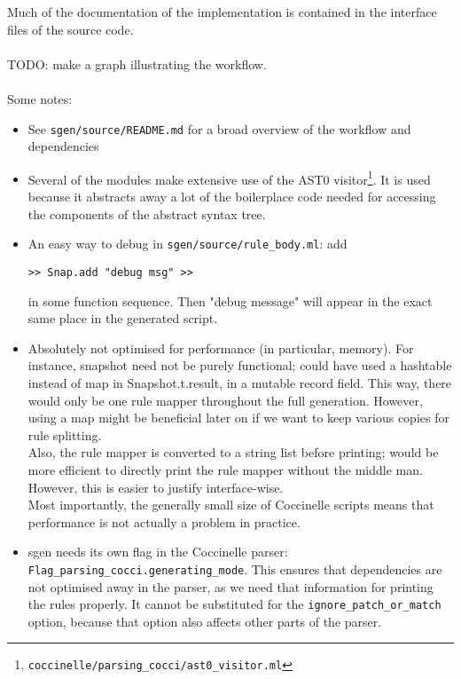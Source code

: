 Much of the documentation of the implementation is contained in the interface files of the source code.\\\\
TODO: make a graph illustrating the workflow.\\\\
Some notes:
\begin{itemize}
\item See \texttt{sgen/source/README.md} for a broad overview of the workflow and dependencies
\item Several of the modules make extensive use of the AST0 visitor\footnote{\texttt{coccinelle/parsing\_cocci/ast0\_visitor.ml}}. It is used because it abstracts away a lot of the boilerplace code needed for accessing the components of the abstract syntax tree.
\item An easy way to debug in \texttt{sgen/source/rule\_body.ml}: add
\begin{verbatim}
>> Snap.add "debug msg" >>
\end{verbatim}
in some function sequence. Then "debug message" will appear in the exact same place in the generated script.
\item Absolutely not optimised for performance (in particular, memory). For instance, snapshot need not be purely functional; could have used a hashtable instead of map in Snapshot.t.result, in a mutable record field. This way, there would only be one rule mapper throughout the full generation. However, using a map might be beneficial later on if we want to keep various copies for rule splitting.\\
Also, the rule mapper is converted to a string list before printing; would be more efficient to directly print the rule mapper without the middle man. However, this is easier to justify interface-wise. \\
Most importantly, the generally small size of Coccinelle scripts means that performance is not actually a problem in practice.
\item sgen needs its own flag in the Coccinelle parser: \texttt{Flag\_parsing\_cocci.generating\_mode}. This ensures that dependencies are not optimised away in the parser, as we need that information for printing the rules properly. It cannot be substituted for the \texttt{ignore\_patch\_or\_match} option, because that option also affects other parts of the parser.
\end{itemize}





